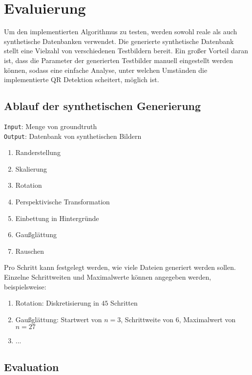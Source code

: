 \chapter{Evaluierung}

Um den implementierten Algorithmus zu testen, werden sowohl reale als auch synthetische Datenbanken verwendet. Die generierte synthetische Datenbank stellt eine Vielzahl von verschiedenen Testbildern bereit. Ein großer Vorteil daran ist, dass die Parameter der generierten Testbilder manuell eingestellt werden können, sodass eine einfache Analyse, unter welchen Umständen die implementierte QR Detektion scheitert, möglich ist.

\section{Ablauf der synthetischen Generierung}

\texttt{Input}: Menge von groundtruth \QRCodes \\
\texttt{Output}: Datenbank von synthetischen Bildern

\begin{enumerate}
	\item Randerstellung
	\item Skalierung
	\item Rotation
	\item Perspektivische Transformation
	\item Einbettung in Hintergründe
	\item Gaußglättung
	\item Rauschen
\end{enumerate}


Pro Schritt kann festgelegt werden, wie viele Dateien generiert werden sollen.
Einzelne Schrittweiten und Maximalwerte können angegeben werden, beispielsweise:
\begin{enumerate}
	\item Rotation: Diskretisierung in $45$ Schritten
	\item Gaußglättung: Startwert von $n=3$, Schrittweite von $6$, Maximalwert von $n=27$
	\item ...
\end{enumerate}

\section{Evaluation}

